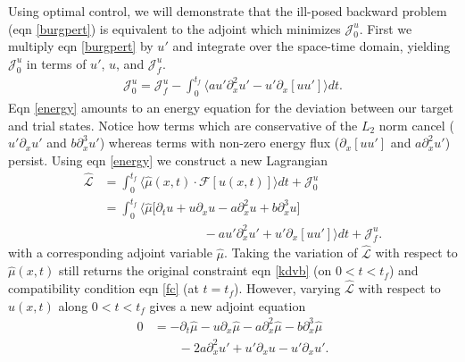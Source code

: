 \documentclass[%
 reprint,
 amsmath,amssymb,
 aps,
 pre,
]{revtex4-2}
\renewcommand\L {\mathcal{L}}
\newcommand{\Juo}{\mathcal{J}^{u}_0}
\newcommand{\Juf}{\mathcal{J}^{u}_f}
\begin{document}
Using optimal control, we will demonstrate that the ill-posed backward problem (eqn \ref{burgpert}) is equivalent to the adjoint which minimizes $\Juo$.
First we multiply eqn \ref{burgpert} by $u'$
and integrate over the space-time domain, yielding $\Juo$ in terms of $u'$, $u$, and $\Juf$.
\begin{align}
  \Juo = \Juf - \int_0^{t_f}\langle au'\partial_x^2 u' - u' \partial_x [uu'] \rangle dt \label{energy}. 
\end{align}
Eqn \ref{energy} amounts to an energy equation for the deviation between our target and trial states. 
  Notice how terms which are conservative of the $L_2$ norm cancel ($u'\partial_x u'$ and $b\partial_x^3 u'$) whereas terms with non-zero energy flux ($\partial_x [uu']$ and $a\partial_x^2 u'$) persist.
  Using eqn \ref{energy} we construct a new Lagrangian 
\begin{align}
  \hat{\L} &= \int_0^{t_f} \langle \hat{\mu}(x,t) \cdot \mathcal{F}[u(x,t)] \rangle dt + \Juo \\
  &= \int_0^{t_f} \Big\langle \hat{\mu}\big[ \partial_t u + u\partial_x u - a\partial_x^2 u + b\partial_x^3 u \big] \nonumber \\
  &\qquad\qquad\qquad\qquad - au'\partial_x^2 u' + u' \partial_x [uu' ] \Big\rangle dt + \Juf. \nonumber
\end{align}
with a corresponding adjoint variable $\hat{\mu}$. 
Taking the variation of $\hat{\L}$ with respect to $\hat{\mu}(x,t)$ still returns the original constraint eqn \ref{kdvb} (on $0<t<t_f$) and compatibility condition eqn \ref{fc} (at $t=t_f$). 
However, varying $\hat{\L}$ with respect to $u(x,t)$ along $0<t<t_f$ gives a new adjoint equation 
\begin{align}
0 &= -\partial_t \hat{\mu} - u\partial_x \hat{\mu} - a\partial_x^2 \hat{\mu} - b\partial_x^3 \hat{\mu} \nonumber \\
&\qquad - 2a\partial_x^2 u' + u'\partial_x u - u'\partial_x u' \label{wadj}.
\end{align}
\end{document}
